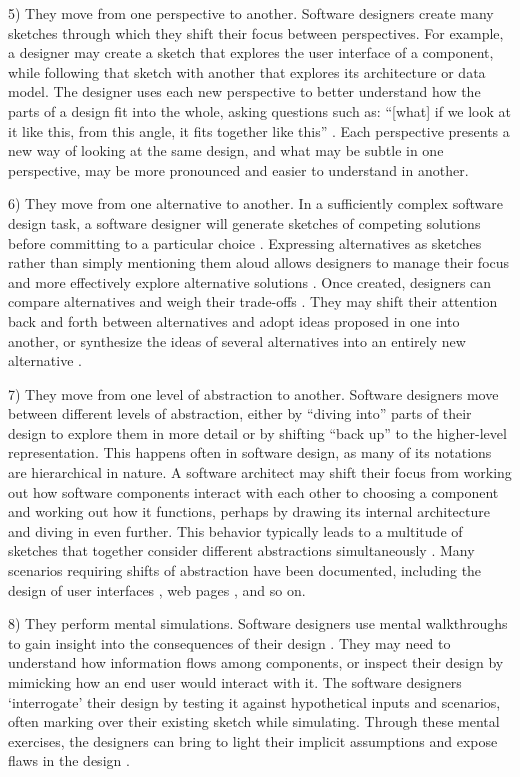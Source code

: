 5)	They move from one perspective to another. Software designers create many sketches through which they shift their focus between perspectives. For example, a designer may create a sketch that explores the user interface of a component, while following that sketch with another that explores its architecture or data model. The designer uses each new perspective to better understand how the parts of a design fit into the whole, asking questions such as: “[what] if we look at it like this, from this angle, it fits together like this” \cite{petre2009insights}. Each perspective presents a new way of looking at the same design, and what may be subtle in one perspective, may be more pronounced and easier to understand in another. 

6)	They move from one alternative to another. In a sufficiently complex software design task, a software designer will generate sketches of competing solutions before committing to a particular choice \cite{zannier2007comparing}. Expressing alternatives as sketches rather than simply mentioning them aloud allows designers to manage their focus and more effectively explore alternative solutions \cite{myers2008designers}. Once created, designers can compare alternatives and weigh their trade-offs \cite{buxton2010sketching}. They may shift their attention back and forth between alternatives and adopt ideas proposed in one into another, or synthesize the ideas of several alternatives into an entirely new alternative \cite{jones1992design}. 

7)	They move from one level of abstraction to another. Software designers move between different levels of abstraction, either by “diving into” parts of their design to explore them in more detail or by shifting “back up” to the higher-level representation. This happens often in software design, as many of its notations are hierarchical in nature. A software architect may shift their focus from working out how software components interact with each other to choosing a component and working out how it functions, perhaps by drawing its internal architecture and diving in even further. This behavior typically leads to a multitude of sketches that together consider different abstractions simultaneously \cite{petre2009insights}. Many scenarios requiring shifts of abstraction have been documented, including the design of user interfaces \cite{da2001user}, web pages \cite{van2003design}, and so on.

8)	They perform mental simulations. Software designers use mental walkthroughs to gain insight into the consequences of their design \cite{zannier2007model}. They may need to understand how information flows among components, or inspect their design by mimicking how an end user would interact with it. The software designers ‘interrogate’ their design by testing it against hypothetical inputs and scenarios, often marking over their existing sketch while simulating. Through these mental exercises, the designers can bring to light their implicit assumptions and expose flaws in the design \cite{petre2009insights}. 

